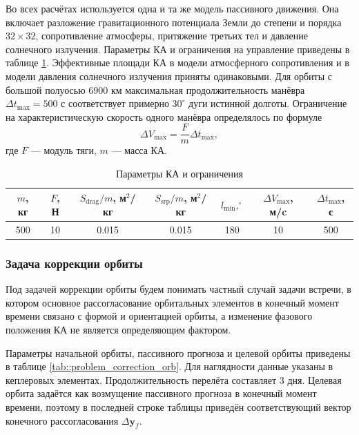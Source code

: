 Во всех расчётах используется одна и та же модель пассивного движения. Она включает разложение гравитационного потенциала Земли до степени и порядка $32 \times 32$, сопротивление атмосферы, притяжение третьих тел и давление солнечного излучения. Параметры КА и ограничения на управление приведены в таблице \ref{tab::problem_correction_params}. Эффективные площади КА в модели атмосферного сопротивления и в модели давления солнечного излучения приняты одинаковыми. Для орбиты с большой полуосью $6900$ км максимальная продолжительность манёвра $\Delta t_{\text{max}} = 500$ с соответствует примерно $30^\circ$ дуги истинной долготы. Ограничение на характеристическую скорость одного манёвра определялось по формуле
\begin{equation}
    \Delta V_{\text{max}} = \frac{F}{m}\Delta t_{\text{max}},
\end{equation}
где $F$ --- модуль тяги, $m$ --- масса КА.

\begin{table}[!h]
\centering
\caption{Параметры КА и ограничения}
\label{tab::problem_correction_params}
\renewcommand{\arraystretch}{1.25}
\begin{tabular}{|c|c|c|c|c|c|c|}
\hline
$m$, кг & 
$F$, Н & 
$S_{\text{drag}} / m$, м$^2$/кг &
$S_{\text{srp}} / m$, м$^2$/кг &
$l_{\text{min}}, ^\circ$ &
$\Delta V_{\text{max}}$, м/c & 
$\Delta t_{\text{max}}$, с \\
\hline
500 & 10 & 0.015 & 0.015 & 180 & 10 & 500 \\
\hline
\end{tabular}
\end{table}

\subsubsection{Задача коррекции орбиты}

Под задачей коррекции орбиты будем понимать частный случай задачи встречи, в котором основное рассогласование орбитальных элементов в конечный момент времени связано с формой и ориентацией орбиты, а изменение фазового положения КА не является определяющим фактором.

Параметры начальной орбиты, пассивного прогноза и целевой орбиты приведены в таблице \ref{tab::problem_correction_orb}. Для наглядности данные указаны в кеплеровых элементах. Продолжительность перелёта составляет $3$ дня. Целевая орбита задаётся как возмущение пассивного прогноза в конечный момент времени, поэтому в последней строке таблицы приведён соответствующий вектор конечного рассогласования $\Delta \mathbf{y}_f$.


